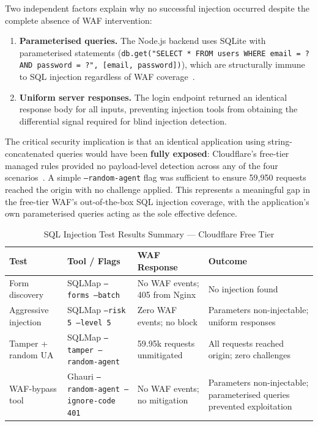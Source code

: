 \documentclass[12pt, a4paper]{report}   %
\begin{document}
Two independent factors explain why no successful injection occurred despite the
complete absence of WAF intervention:

\begin{enumerate}
  \item \textbf{Parameterised queries.} The Node.js backend uses SQLite with
        parameterised statements (\texttt{db.get("SELECT * FROM users WHERE email = ?
        AND password = ?", [email, password])}), which are structurally immune to SQL
        injection regardless of WAF coverage~\cite{nist-800-53}.
  \item \textbf{Uniform server responses.} The login endpoint returned an identical
        response body for all inputs, preventing injection tools from obtaining the
        differential signal required for blind injection detection.
\end{enumerate}

The critical security implication is that an identical application using 
string-concatenated queries would have been \textbf{fully exposed}: Cloudflare's 
free-tier managed rules provided no payload-level detection across any of the four 
scenarios~\cite{owasp-waf}. A simple \texttt{--random-agent} flag was sufficient to 
ensure 59,950 requests reached the origin with no challenge applied. This represents 
a meaningful gap in the free-tier WAF's out-of-the-box SQL injection coverage, with 
the application's own parameterised queries acting as the sole effective defence.

\begin{table}[H]
  \centering
  \caption{SQL Injection Test Results Summary --- Cloudflare Free Tier}
  \label{tab:cf-sqli-summary}
  \small
  \begin{tabularx}{\textwidth}{lXXX}
    \toprule
    \textbf{Test} & \textbf{Tool / Flags} & \textbf{WAF Response} 
      & \textbf{Outcome} \\
    \midrule
    Form discovery
      & SQLMap \texttt{--forms --batch}
      & No WAF events; 405 from Nginx
      & No injection found \\
    \addlinespace
    Aggressive injection
      & SQLMap \texttt{--risk 5 --level 5}
      & Zero WAF events; no block
      & Parameters non-injectable; uniform responses \\
    \addlinespace
    Tamper + random UA
      & SQLMap \texttt{--tamper --random-agent}
      & 59.95k requests unmitigated
      & All requests reached origin; zero challenges \\
    \addlinespace
    WAF-bypass tool
      & Ghauri \texttt{--random-agent --ignore-code 401}
      & No WAF events; no mitigation
      & Parameters non-injectable; parameterised 
        queries prevented exploitation \\
    \bottomrule
  \end{tabularx}
\end{table}
\end{document}
